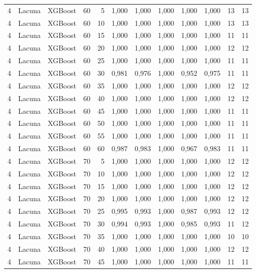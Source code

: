\begin{longtable}{@{}rllrrrrrrrrr@{}}
4 & Lacuna & XGBoost & 60 & 5 & 1,000 & 1,000 & 1,000 & 1,000 & 1,000 & 13 & 13 \\
4 & Lacuna & XGBoost & 60 & 10 & 1,000 & 1,000 & 1,000 & 1,000 & 1,000 & 13 & 13 \\
4 & Lacuna & XGBoost & 60 & 15 & 1,000 & 1,000 & 1,000 & 1,000 & 1,000 & 11 & 11 \\
4 & Lacuna & XGBoost & 60 & 20 & 1,000 & 1,000 & 1,000 & 1,000 & 1,000 & 12 & 12 \\
4 & Lacuna & XGBoost & 60 & 25 & 1,000 & 1,000 & 1,000 & 1,000 & 1,000 & 11 & 11 \\
4 & Lacuna & XGBoost & 60 & 30 & 0,981 & 0,976 & 1,000 & 0,952 & 0,975 & 11 & 11 \\
4 & Lacuna & XGBoost & 60 & 35 & 1,000 & 1,000 & 1,000 & 1,000 & 1,000 & 12 & 12 \\
4 & Lacuna & XGBoost & 60 & 40 & 1,000 & 1,000 & 1,000 & 1,000 & 1,000 & 12 & 12 \\
4 & Lacuna & XGBoost & 60 & 45 & 1,000 & 1,000 & 1,000 & 1,000 & 1,000 & 11 & 11 \\
4 & Lacuna & XGBoost & 60 & 50 & 1,000 & 1,000 & 1,000 & 1,000 & 1,000 & 11 & 11 \\
4 & Lacuna & XGBoost & 60 & 55 & 1,000 & 1,000 & 1,000 & 1,000 & 1,000 & 11 & 11 \\
4 & Lacuna & XGBoost & 60 & 60 & 0,987 & 0,983 & 1,000 & 0,967 & 0,983 & 11 & 11 \\
4 & Lacuna & XGBoost & 70 & 5 & 1,000 & 1,000 & 1,000 & 1,000 & 1,000 & 12 & 12 \\
4 & Lacuna & XGBoost & 70 & 10 & 1,000 & 1,000 & 1,000 & 1,000 & 1,000 & 12 & 12 \\
4 & Lacuna & XGBoost & 70 & 15 & 1,000 & 1,000 & 1,000 & 1,000 & 1,000 & 12 & 12 \\
4 & Lacuna & XGBoost & 70 & 20 & 1,000 & 1,000 & 1,000 & 1,000 & 1,000 & 12 & 12 \\
4 & Lacuna & XGBoost & 70 & 25 & 0,995 & 0,993 & 1,000 & 0,987 & 0,993 & 12 & 12 \\
4 & Lacuna & XGBoost & 70 & 30 & 0,994 & 0,993 & 1,000 & 0,985 & 0,993 & 11 & 12 \\
4 & Lacuna & XGBoost & 70 & 35 & 1,000 & 1,000 & 1,000 & 1,000 & 1,000 & 10 & 10 \\
4 & Lacuna & XGBoost & 70 & 40 & 1,000 & 1,000 & 1,000 & 1,000 & 1,000 & 12 & 12 \\
4 & Lacuna & XGBoost & 70 & 45 & 1,000 & 1,000 & 1,000 & 1,000 & 1,000 & 11 & 11 \\

\end{longtable}
